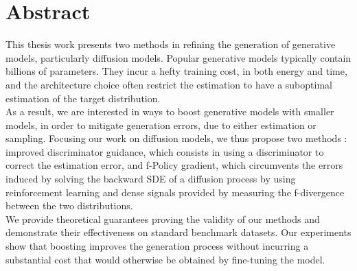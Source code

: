 %
\chapter*{Abstract}\label{sec:abstract}
\vspace*{-10mm}
This thesis work presents two methods in refining the generation of generative models, particularly diffusion models.
Popular generative models typically contain billions of parameters. They incur a hefty training cost, in both energy and time, and the architecture choice often restrict the estimation to have a suboptimal estimation of the target distribution.
\\
As a result, we are interested in ways to boost generative models with smaller models, in order to mitigate generation errors, due to either estimation or sampling. Focusing our work on diffusion models, we thus propose two methods : improved discriminator guidance, which consists in using a discriminator to correct the estimation error, and f-Policy gradient, which circumvents the errors induced by solving the backward SDE of a diffusion process by using reinforcement learning and dense signals provided by measuring the f-divergence between the two distributions.
\\ 
We provide theoretical guarantees proving the validity of our methods and demonstrate their effectiveness on standard benchmark datasets. Our experiments show that boosting improves the generation process without incurring a substantial cost that would otherwise be obtained by fine-tuning the model.
\vspace*{20mm}

